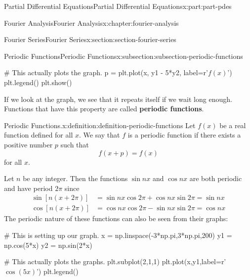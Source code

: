 \documentclass[twoside,10pt,]{book}
\newcommand{\terminology}[1]{\textbf{#1}}
\numberwithin{equation}{part}
\newcommand{\amp}{&}
\begin{document}
\begin{partptx}{Partial Differential Equations}{}{Partial Differential Equations}{}{}{x:part:part-pdes}
\begin{chapterptx}{Fourier Analysis}{}{Fourier Analysis}{}{}{x:chapter:fourier-analysis}
\begin{sectionptx}{Fourier Series}{}{Fourier Series}{}{}{x:section:section-fourier-series}
\begin{subsectionptx}{Periodic Functions}{}{Periodic Functions}{}{}{x:subsection:subsection-periodic-functions}
\begin{sageinput}
# This actually plots the graph.
p = plt.plot(x, y1 - 5*y2, label=r'$f(x)$')
plt.legend()
plt.show()
\end{sageinput}
If we look at the graph, we see that it repeats itself if we wait long enough. Functions that have this property are called \terminology{periodic functions}.%
\begin{definition}{Periodic Functions.}{x:definition:definition-periodic-functions}%
%
Let \(f(x)\) be a real function defined for all \(x\). We say that \(f\) is a periodic function if there exists a positive number \(p\) such that%
\begin{equation*}
f(x+p) = f(x)
\end{equation*}
for all \(x\).%
\end{definition}
 Let \(n\) be any integer. Then the functions \(\sin nx\) and \(\cos nx\) are both periodic and have period \(2\pi\) since%
\begin{align*}
\sin[n(x+2\pi)] \amp = \sin nx\cos2\pi + \cos nx\sin2\pi = \sin nx \\
\cos[n(x+2\pi)] \amp = \cos nx\cos2\pi - \sin nx\sin2\pi = \cos nx 
\end{align*}
The periodic nature of these functions can also be seen from their graphs:%
 \begin{sageinput}
# This is setting up our graph.
x = np.linspace(-3*np.pi,3*np.pi,200)
y1 = np.cos(5*x)
y2 = np.sin(2*x)

# This actually plots the graphs.
plt.subplot(2,1,1)
plt.plot(x,y1,label=r'$\cos(5x)$')
plt.legend()


\end{sageinput}
\end{subsectionptx}
\end{sectionptx}
\end{chapterptx}
\end{partptx}
\end{document}
